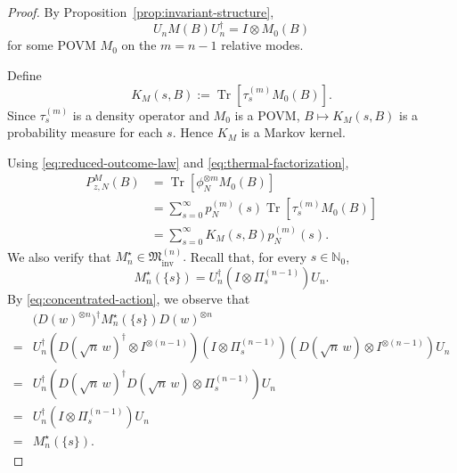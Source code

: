 \documentclass{article}
\theoremstyle{named}
\theoremstyle{named1}
\newcommand{\N}{\mathbb{N}}
\newcommand{\Tr}{\operatorname{Tr}}
\newcommand{\cM}{\mathfrak M}
\theoremstyle{plain}
\theoremstyle{remark}
\begin{document}
\begin{proof}
By Proposition~\ref{prop:invariant-structure},
\[
    U_nM(B)U_n^\dagger
    =
    I\otimes M_0(B)
\]
for some POVM $M_0$ on the $m=n-1$ relative modes.

Define
\begin{equation}
    K_M(s,B)
    :=
    \Tr\left[
        \tau_s^{(m)}M_0(B)
    \right].
    \label{eq:thermal-kernel}
\end{equation}
Since $\tau_s^{(m)}$ is a density operator and $M_0$ is a POVM,
$B\longmapsto K_M(s,B)$ 
is a probability measure for each $s$. Hence $K_M$ is a Markov kernel.

Using \eqref{eq:reduced-outcome-law} and
\eqref{eq:thermal-factorization},
\[
\begin{aligned}
    P_{z,N}^{M}(B)
    &=
    \Tr\left[
        \phi_N^{\otimes m}M_0(B)
    \right]
    \\
    &=
    \sum_{s=0}^{\infty}
    p_N^{(m)}(s)
    \Tr\left[
        \tau_s^{(m)}M_0(B)
    \right]
    \\
    &=
    \sum_{s=0}^{\infty}
    K_M(s,B)p_N^{(m)}(s).
\end{aligned}
\]
We also verify that
$M_n^\star\in\cM_{\mathrm{inv}}^{(n)}.$
Recall that, for every $s\in\N_0$,
\[
    M_n^\star(\{s\})
    =
    U_n^\dagger
    \left(
        I\otimes\Pi_s^{(n-1)}
    \right)
    U_n.
\]
By \eqref{eq:concentrated-action}, we observe that
\begin{align*}
&\bigl(D(w)^{\otimes n}\bigr)^\dagger
M_n^\star(\{s\})
D(w)^{\otimes n}
\\
=&
U_n^\dagger
\left(
    D(\sqrt n\,w)^\dagger\otimes I^{\otimes(n-1)}
\right)
\left(
    I\otimes\Pi_s^{(n-1)}
\right)
\left(
    D(\sqrt n\,w)\otimes I^{\otimes(n-1)}
\right)
U_n
\\
=&
U_n^\dagger
\left(
    D(\sqrt n\,w)^\dagger D(\sqrt n\,w)
    \otimes\Pi_s^{(n-1)}
\right)
U_n
\\
= &
U_n^\dagger
\left(
    I\otimes\Pi_s^{(n-1)}
\right)
U_n
\\
= &
M_n^\star(\{s\}).
\end{align*}


\end{proof}
\end{document}
